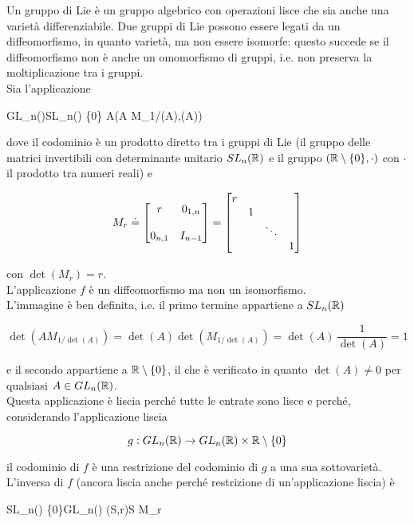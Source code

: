 Un gruppo di Lie è un gruppo algebrico con operazioni lisce che sia anche una varietà differenziabile. Due gruppi di Lie possono essere legati da un diffeomorfismo, in quanto varietà, ma non essere isomorfe: questo succede se il diffeomorfismo non è anche un omomorfismo di gruppi, i.e. non preserva la moltiplicazione tra i gruppi.\\
Sia l'applicazione

	{GL_{n}(\R)}{SL_{n}(\R) \times \R \setminus \{0\}}
	{A}{(A M_{1/\det(A)},\det(A))}

dove il codominio è un prodotto diretto tra i gruppi di Lie (il gruppo delle matrici invertibili con determinante unitario $ SL_{n}(\mathbb{R}) $ e il gruppo $ (\mathbb{R} \setminus \{0\},\cdot) $ con $ \cdot $ il prodotto tra numeri reali) e

\begin{equation}
	M_{r} \doteq %
	\bmqty{ %
			r & 0_{1,n} \\\\
			0_{n,1} & I_{n-1} %
			} = %
	\bmqty{ %
			\dmat{ %
					r, %
					1, %
					\ddots, %
					1 %
					} %
			}
\end{equation}

con $ \det(M_{r}) = r $.\\
L'applicazione $ f $ è un diffeomorfismo ma non un isomorfismo.\\
L'immagine è ben definita, i.e. il primo termine appartiene a $ SL_{n}(\mathbb{R}) $

\begin{equation}
	\det(A M_{1/\det(A)}) = \det(A) \det(M_{1/\det(A)}) = \det(A) \, \dfrac{1}{\det(A)} = 1
\end{equation}

e il secondo appartiene a $ \mathbb{R} \setminus \{0\} $, il che è verificato in quanto $ \det(A) \neq 0 $ per qualsiasi $ A \in GL_{n}(\mathbb{R}) $.\\
Questa applicazione è liscia perché tutte le entrate sono lisce e perché, considerando l'applicazione liscia

\begin{equation}
	g : GL_{n}(\mathbb{R}) \to GL_{n}(\mathbb{R}) \times \mathbb{R} \setminus \{0\}
\end{equation}
 
il codominio di $ f $ è una restrizione del codominio di $ g $ a una sua sottovarietà.\\
L'inversa di $ f $ (ancora liscia anche perché restrizione di un'applicazione liscia) è

	{SL_{n}(\R) \times \R \setminus \{0\}}{GL_{n}(\R)}
	{(S,r)}{S M_{r}}


